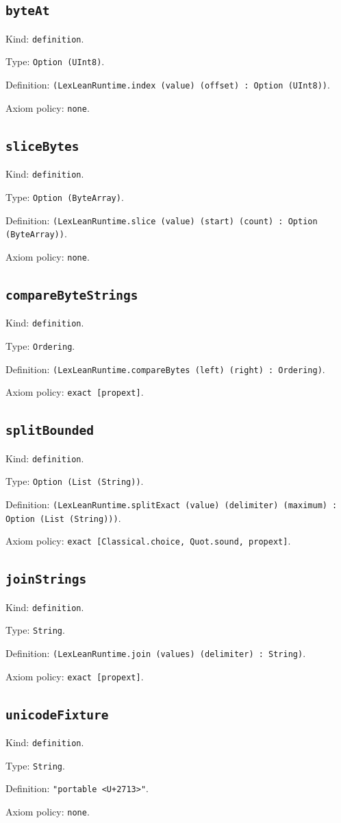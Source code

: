 \documentclass[11pt]{article}
\begin{document}
\subsection*{\texttt{byteAt}}
\noindent Kind: \texttt{definition}.\par
\noindent Type: \texttt{Option (UInt8)}.\par
\noindent Definition: \texttt{(LexLeanRuntime.index (value) (offset) : Option (UInt8))}.\par
\noindent Axiom policy: \texttt{none}.\par
\subsection*{\texttt{sliceBytes}}
\noindent Kind: \texttt{definition}.\par
\noindent Type: \texttt{Option (ByteArray)}.\par
\noindent Definition: \texttt{(LexLeanRuntime.slice (value) (start) (count) : Option (ByteArray))}.\par
\noindent Axiom policy: \texttt{none}.\par
\subsection*{\texttt{compareByteStrings}}
\noindent Kind: \texttt{definition}.\par
\noindent Type: \texttt{Ordering}.\par
\noindent Definition: \texttt{(LexLeanRuntime.compareBytes (left) (right) : Ordering)}.\par
\noindent Axiom policy: \texttt{exact [propext]}.\par
\subsection*{\texttt{splitBounded}}
\noindent Kind: \texttt{definition}.\par
\noindent Type: \texttt{Option (List (String))}.\par
\noindent Definition: \texttt{(LexLeanRuntime.splitExact (value) (delimiter) (maximum) : Option (List (String)))}.\par
\noindent Axiom policy: \texttt{exact [Classical.choice, Quot.sound, propext]}.\par
\subsection*{\texttt{joinStrings}}
\noindent Kind: \texttt{definition}.\par
\noindent Type: \texttt{String}.\par
\noindent Definition: \texttt{(LexLeanRuntime.join (values) (delimiter) : String)}.\par
\noindent Axiom policy: \texttt{exact [propext]}.\par
\subsection*{\texttt{unicodeFixture}}
\noindent Kind: \texttt{definition}.\par
\noindent Type: \texttt{String}.\par
\noindent Definition: \texttt{"portable <U+2713>"}.\par
\noindent Axiom policy: \texttt{none}.\par
\end{document}

